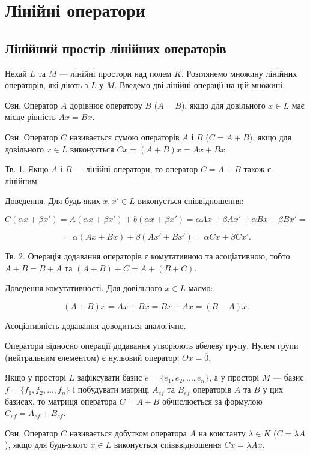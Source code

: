 \chapter{Лінійні оператори}


\section{Лінійний простір лінійних операторів}

Нехай $L$ та $M$ --- лінійні простори над полем $K$. Розглянемо множину лінійних
операторів, які діють з $L$ у $M$. Введемо дві лінійні операції на цій множині.


Озн. Оператор $A$ дорівнює оператору $B$ ($A = B$), якщо для довільного $x \in L$
має місце рівність $A x = B x$.


Озн. Оператор $C$ називається сумою операторів $A$ і $B$ ($C = A + B$), якщо для
довільного $x \in L$ виконується $C x = (A + B)x = A x + B x$.


Тв. 1. Якщо $A$ і $B$ --- лінійні оператори, то оператор $C = A + B$ також є
лінійним.

Доведення. Для будь-яких $x, x' \in L$ виконується співвідношення:

$$C(\alpha x + \beta x') = A(\alpha x + \beta x') + b(\alpha x + \beta x') = \alpha A x + \beta A x' + \alpha B x + \beta B x' =$$

$$= \alpha(A x + B x) + \beta(A x' + B x') = \alpha C x + \beta C x'.$$


Тв. 2. Операція додавання операторів є комутативною та асоціативною, тобто
$A + B = B + A$ та $(A + B) + C = A + (B + C).$

Доведення комутативності. Для довільного $x \in L$ маємо:

$$(A + B)x = A x + B x = B x + A x = (B + A) x.$$


Асоціативність додавання доводиться аналогічно.

Оператори відносно операції додавання утворюють абелеву групу. Нулем
групи (нейтральним елементом) є нульовий оператор: $Ox = \overline{0}$.


Якщо у просторі $L$ зафіксувати базис $e = \{e_1, e_2, ..., e_n\}$, а у просторі $M$ ---
базис $f = \{f_1, f_2, ..., f_n\}$ і побудувати матриці $A_{ef}$ та $B_{ef}$ операторів $A$ та $B$ у
цих базисах, то матриця оператора $C = A + B$ обчислюється за формулою
$C_{ef} = A_{ef} + B_{ef}$.


Озн. Оператор $C$ називається добутком оператора $A$ на константу $\lambda \in K$
($C = \lambda A$), якщо для будь-якого $x \in L$ виконується співввідношення $C x = \lambda A x$.


